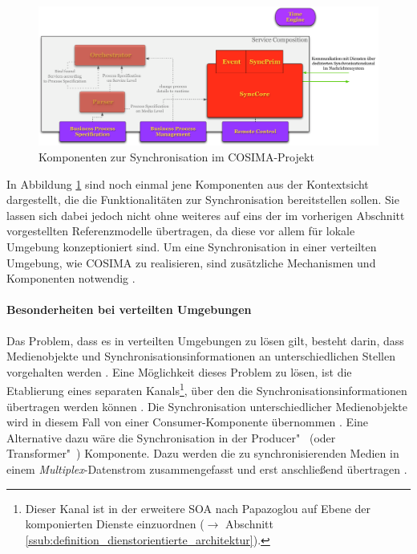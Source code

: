   
\label{msec:umsetzung_in_cosima}

  \begin{figure}[!ht]
    \centering
      \includegraphics[width=.9\textwidth]{images/Servicekomposition_syncpart.pdf}
    \caption{Komponenten zur Synchronisation im COSIMA-Projekt}
    \label{fig:images_Servicekomposition_syncpart}
  \end{figure}
  
  In Abbildung \ref{fig:images_Servicekomposition_syncpart} sind noch einmal jene Komponenten aus der Kontextsicht dargestellt, die die Funktionalitäten zur Synchronisation bereitstellen sollen. Sie lassen sich dabei jedoch nicht ohne weiteres auf eins der im vorherigen Abschnitt vorgestellten Referenzmodelle übertragen, da diese vor allem für lokale Umgebung konzeptioniert sind. Um eine Synchronisation in einer verteilten Umgebung, wie COSIMA zu realisieren, sind zusätzliche Mechanismen und Komponenten notwendig \citep[S. 608ff]{multimedia_technologie}. 
  
\paragraph{Besonderheiten bei verteilten Umgebungen} %
\label{par:besonderheiten_bei_verteilten_umgebungen}

  Das Problem, dass es in verteilten Umgebungen zu lösen gilt, besteht darin, dass Medienobjekte und Synchronisationsinformationen an unterschiedlichen Stellen vorgehalten werden \citep[S. 607]{multimedia_technologie}. Eine Möglichkeit dieses Problem zu lösen, ist die Etablierung eines separaten Kanals\footnote{Dieser Kanal ist in der erweitere SOA nach Papazoglou auf Ebene der komponierten Dienste einzuordnen ($\to$ Abschnitt \ref{ssub:definition_dienstorientierte_architektur}).}, über den die Synchronisationsinformationen übertragen werden können \citep[S. 608]{multimedia_technologie}. Die Synchronisation unterschiedlicher Medienobjekte wird in diesem Fall von einer Consumer-Komponente übernommen \citep[S. 608]{multimedia_technologie}. Eine Alternative dazu wäre die Synchronisation in der Producer"~ (oder Transformer"~) Komponente. Dazu werden die zu synchronisierenden Medien in einem \emph{Multiplex}-Datenstrom zusammengefasst und erst anschließend übertragen \citep[S. 609]{multimedia_technologie}.
  
